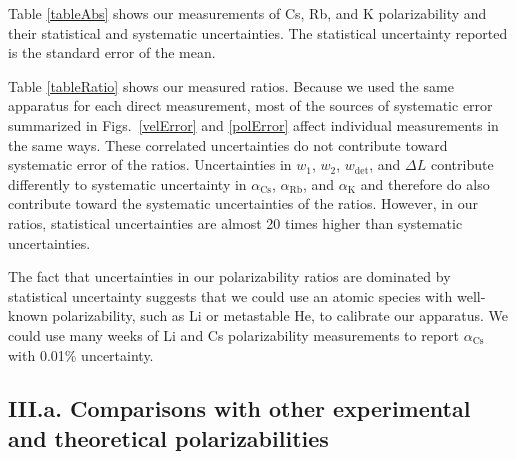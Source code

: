 \documentclass[twocolumn,prl,showpacs,superscriptaddress]{revtex4-1}   %
\newcommand{\ak}{\alpha_{\textrm{K}}}
\newcommand{\arb}{\alpha_{\textrm{Rb}}}
\newcommand{\acs}{\alpha_{\textrm{Cs}}}
\begin{document}
Table \ref{tableAbs} shows our measurements of Cs, Rb, and K polarizability and their statistical and systematic uncertainties. The statistical uncertainty reported is the standard error of the mean.

Table \ref{tableRatio} shows our measured ratios. 
Because we used the same apparatus for each direct measurement,
most of the sources of systematic error summarized in Figs.~\ref{velError} and \ref{polError} 
affect individual measurements in the same ways.
These correlated uncertainties do not contribute toward systematic error of the ratios. 
Uncertainties in $w_1$, $w_2$, $w_{\mathrm{det}}$, and $\Delta L$ contribute differently to systematic uncertainty in $\acs$, $\arb$, and $\ak$ and therefore do also contribute toward the systematic uncertainties of the ratios.
However, in our ratios, statistical uncertainties are almost 20 times higher than systematic uncertainties.

The fact that uncertainties in our polarizability ratios are dominated by statistical uncertainty suggests that we could use an atomic species with well-known polarizability, such as Li or metastable He, to calibrate our apparatus. We could use many weeks of Li and Cs polarizability measurements to report $\acs$ with 0.01\% uncertainty.

\subsection{III.a. Comparisons with other experimental and theoretical polarizabilities}
\end{document}
